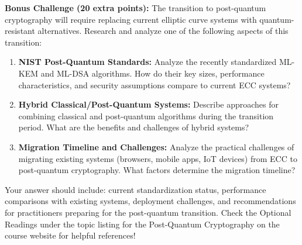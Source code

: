 \documentclass[10pt,a4paper,american]{exam}
\begin{document}
\begin{tcolorbox}[colframe=EarthBrown!30!white,colback=EarthBrown!5!white]
	\textbf{Bonus Challenge (20 extra points):} The transition to post-quantum cryptography will require replacing current elliptic curve systems with quantum-resistant alternatives. Research and analyze one of the following aspects of this transition:
	\begin{enumerate}
		\item \textbf{NIST Post-Quantum Standards:} Analyze the recently standardized ML-KEM and ML-DSA algorithms. How do their key sizes, performance characteristics, and security assumptions compare to current ECC systems?
		\item \textbf{Hybrid Classical/Post-Quantum Systems:} Describe approaches for combining classical and post-quantum algorithms during the transition period. What are the benefits and challenges of hybrid systems?
		\item \textbf{Migration Timeline and Challenges:} Analyze the practical challenges of migrating existing systems (browsers, mobile apps, IoT devices) from ECC to post-quantum cryptography. What factors determine the migration timeline?
	\end{enumerate}
	Your answer should include: current standardization status, performance comparisons with existing systems, deployment challenges, and recommendations for practitioners preparing for the post-quantum transition. Check the Optional Readings under the topic listing for the Post-Quantum Cryptography on the course website for helpful references!
\end{tcolorbox}
\end{document}
